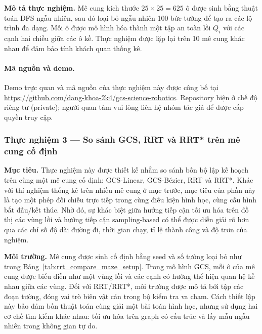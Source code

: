 \textbf{Mô tả thực nghiệm.}
Mê cung kích thước $25 \times 25 = 625$ ô được sinh bằng thuật toán DFS ngẫu nhiên, sau đó loại bỏ ngẫu nhiên 100 bức tường để tạo ra các lộ trình đa dạng. Mỗi ô được mô hình hóa thành một tập an toàn lồi $Q_i$ với các cạnh hai chiều giữa các ô kề. Thực nghiệm được lặp lại trên 10 mê cung khác nhau để đảm bảo tính khách quan thống kê.

\paragraph*{Mã nguồn và demo.}
Demo trực quan và mã nguồn của thực nghiệm này được công bố tại
\url{https://github.com/dang-khoa-2k4/gcs-science-robotics}.
Repository hiện ở chế độ riêng tư (private); người quan tâm vui lòng liên hệ
nhóm tác giả để được cấp quyền truy cập.

\subsubsection{Thực nghiệm 3 — So sánh GCS, RRT và RRT* trên mê cung cố định}
\label{subsubsec:scenario_rrt_compare}

\textbf{Mục tiêu.}
Thực nghiệm này được thiết kế nhằm so sánh bốn bộ lập kế hoạch trên cùng một
mê cung cố định: GCS-Linear, GCS-Bézier, RRT và RRT*. Khác với thí nghiệm thống
kê trên nhiều mê cung ở mục trước, mục tiêu của phần này là tạo một phép đối
chiếu trực tiếp trong cùng điều kiện hình học, cùng cấu hình bắt đầu/kết thúc.
Nhờ đó, sự khác biệt giữa hướng tiếp cận tối ưu hóa trên đồ thị các vùng lồi và
hướng tiếp cận sampling-based có thể được diễn giải rõ hơn qua các chỉ số độ dài
đường đi, thời gian chạy, tỉ lệ thành công và độ trơn của nghiệm.

\textbf{Môi trường.}
Mê cung được sinh cố định bằng seed và số tường loại bỏ như trong
Bảng~\ref{tab:rrt_compare_maze_setup}. Trong mô hình GCS, mỗi ô của mê cung
được biểu diễn như một vùng lồi và các cạnh có hướng thể hiện quan hệ kề nhau
giữa các vùng. Đối với RRT/RRT*, môi trường được mô tả bởi tập các đoạn tường,
đóng vai trò biên vật cản trong bộ kiểm tra va chạm. Cách thiết lập này bảo đảm
bốn thuật toán cùng giải một bài toán hình học, nhưng sử dụng hai cơ chế tìm
kiếm khác nhau: tối ưu hóa trên graph có cấu trúc và lấy mẫu ngẫu nhiên trong
không gian tự do.

